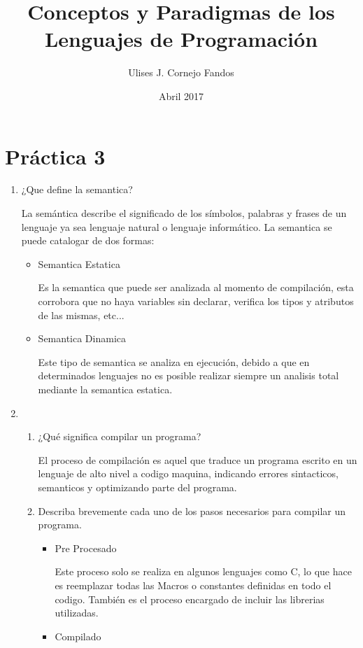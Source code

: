\documentclass[a4paper,10pt]{article}
\title{Conceptos y Paradigmas de los Lenguajes de Programación}
\author{Ulises J. Cornejo Fandos}
\date{Abril 2017}
\begin{document}
\maketitle


\section{Práctica 3}

\begin{enumerate}
\item ¿Que define la semantica?


La semántica describe el significado de los símbolos, palabras y frases de un lenguaje ya sea lenguaje natural o lenguaje informático. La semantica se puede catalogar de dos formas:

\begin{itemize}
\item Semantica Estatica

Es la semantica que puede ser analizada al momento de compilación, esta corrobora que no haya variables sin declarar, verifica los tipos y atributos de las mismas, etc...
\item Semantica Dinamica

Este tipo de semantica se analiza en ejecución, debido a que en determinados lenguajes no es posible realizar siempre un analisis total mediante la semantica estatica.
\end{itemize}

\item
\begin{enumerate}
\item ¿Qué significa compilar un programa?

El proceso de compilación es aquel que traduce un programa escrito en un lenguaje de alto nivel a codigo maquina, indicando errores sintacticos, semanticos y optimizando parte del programa.

\item Describa brevemente cada uno de los pasos necesarios para compilar un programa.

\begin{itemize}
\item Pre Procesado

Este proceso solo se realiza en algunos lenguajes como C, lo que hace es reemplazar todas las Macros o constantes definidas en todo el codigo. También es el proceso encargado de incluir las librerias utilizadas.

\item Compilado


\end{itemize}
\end{enumerate}
\end{enumerate}
\end{document}
